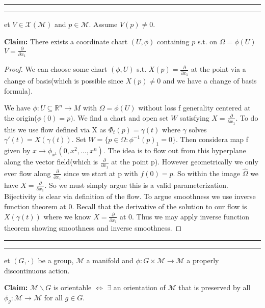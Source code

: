 \documentclass[11pt]{article}
\newcommand{\R}{\mathbb{R}}
\newcommand{\m}{\mathcal{M}}
\newcommand{\question}[2] {\vspace{.25in} \hrule\vspace{0.5em}
\noindent{\bf #1: #2} \vspace{0.5em}
\hrule \vspace{.10in}}
\begin{document}
\question{Question 2}


Let $V \in \mathcal{X}(\m)$ and $p \in \m$. Assume $V(p) \neq 0$. 

\textbf{Claim:} There exists a coordinate chart $(U,\phi)$ containing $p$ s.t. on $\Omega = \phi(U)$ $V = \frac{\partial}{\partial x_1}$

\begin{proof}

We can choose some chart $(\phi,U)$ s.t. $X(p) = \frac{\partial }{\partial x_1}$ at the point via a change of basis(which is possible since $X(p) \neq 0$ and we have a change of basis formula). 


 We have $\phi : U \subseteq \R^n \to M$ with $\Omega = \phi(U)$ without loss f generality centered at the origin($\phi(0) = p)$. We find a chart and open set $W$ satisfying $X = \frac{\partial}{\partial x_1}$. To do this we use flow defined via X as $\Phi_t(p) = \gamma(t)$ where $\gamma$ solves $\gamma'(t) = X(\gamma(t))$. Set $W = \{p \in \Omega : \phi^{-1}(p)_1 = 0\}$. Then considera map f given by $x \to \phi_{x^1}(0,x^2,...,x^n)$. The idea is to flow out from this hyperplane along the vector field(which is $\frac{\partial}{\partial x_1}$ at the point p). However geometrically we only ever flow along $\frac{\partial}{\partial x_1}$ since we start at p with $f(0) = p$. So within the image $\widehat{\Omega}$ we have $X = \frac{\partial}{\partial x_1}$. So we must simply argue this is a valid parameterization. Bijectivity is clear via definition of the flow. To argue smoothness we use inverse function theorem at $0$. Recall that the derivative of the solution to our flow is $X(\gamma(t))$ where we know $X = \frac{\partial}{\partial x_1}$ at 0. Thus we may apply inverse function theorem showing smoothness and inverse smoothness.


\end{proof}


\question{Question 3}

Let $(G,\cdot)$ be a group, $\m$ a manifold and $\phi : G \times \m \to \m$ a properly discontinuous action.

\textbf{Claim:} $\m \backslash G$ is orientable $\iff$ $\exists$ an orientation of $\m$ that is preserved by all $\phi_g : \m \to \m$ for all $g \in G$.
\end{document}
